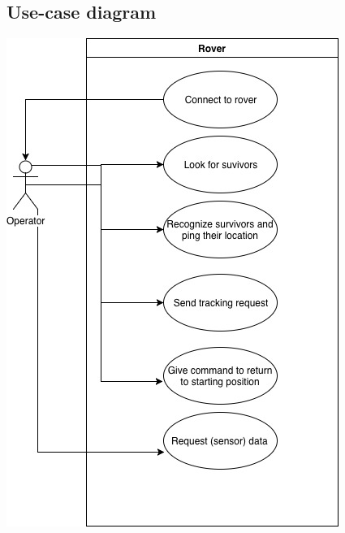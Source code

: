 \documentclass[12pt]{article}
\begin{document}
 	\subsection{Use-case diagram}
 	\includegraphics[width=\linewidth]{UseCaseDiagram.jpeg}
\end{document}

